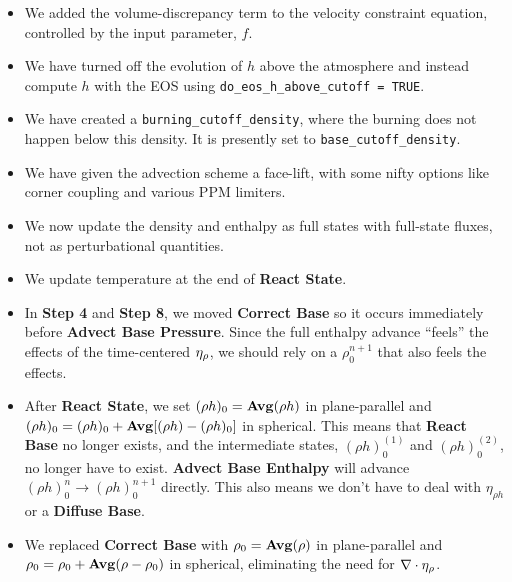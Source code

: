\begin{itemize}
\item We added the volume-discrepancy term to the velocity constraint equation,
controlled by the input parameter, $f$.

\item We have turned off the evolution of $h$ above the atmosphere and instead
compute $h$ with the EOS using {\tt do\_eos\_h\_above\_cutoff = TRUE}.

\item We have created a {\tt burning\_cutoff\_density}, where the burning does
not happen below this density.  It is presently set to {\tt base\_cutoff\_density}.

\item We have given the advection scheme a face-lift, with some nifty options like
corner coupling and various PPM limiters.

\item We now update the density and enthalpy as full states with full-state fluxes, 
not as perturbational quantities.

\item We update temperature at the end of {\bf React State}.

\item In {\bf Step 4} and {\bf Step 8}, we moved {\bf Correct Base} so it
occurs immediately before {\bf Advect Base Pressure}.  Since the full
enthalpy advance ``feels'' the effects of the time-centered $\eta_{\rho}$, we should
rely on a $\rho_0^{n+1}$ that also feels the effects.

\item After {\bf React State}, we set $(\rho h)_0 = {\rm{\bf Avg}}(\rho h)$ in 
plane-parallel and $(\rho h)_0 = (\rho h)_0 + {\rm{\bf Avg}}[(\rho h) - (\rho h)_0]$ 
in spherical.  This means that {\bf React Base} no longer exists, and the intermediate states, 
$(\rho h)_0^{(1)}$ and $(\rho h)_0^{(2)}$, no longer have to exist.  
{\bf Advect Base Enthalpy} will advance $(\rho h)_0^n \rightarrow (\rho h)_0^{n+1}$ 
directly.  This also means we don't have to deal with $\eta_{\rho h}$ or a 
{\bf Diffuse Base}.

\item We replaced {\bf Correct Base} with $\rho_0 = {\rm{\bf Avg}}(\rho)$ in 
plane-parallel and $\rho_0 = \rho_0 + {\rm{\bf Avg}}(\rho - \rho_0)$ in spherical,
eliminating the need for $\nabla\cdot\eta_{\rho}$.

\end{itemize}


